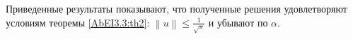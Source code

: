 






Приведенные результаты показывают, что полученные решения удовлетворяют условиям теоремы \ref{AbEI3.3:th2}: $\left\|u\right\|\le \frac{1}{\sqrt{\pi }}$ и убывают по $\alpha $.
